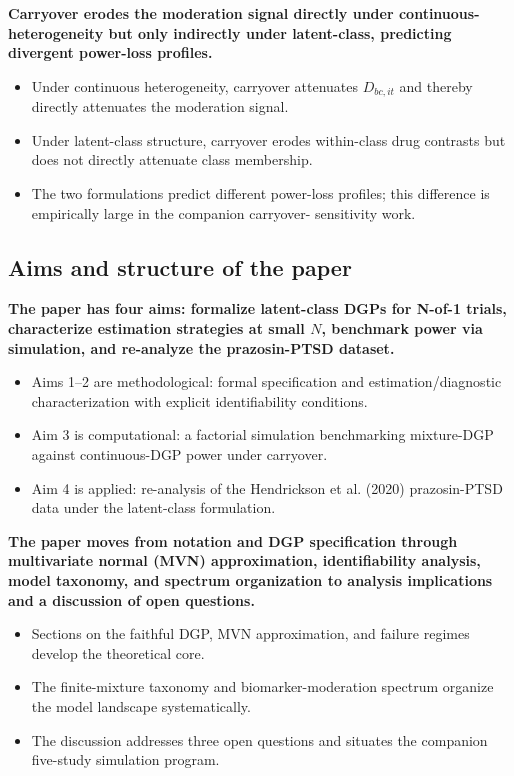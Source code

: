 \documentclass[
  11pt,
]{article}
\begin{document}
\textbf{Carryover erodes the moderation signal directly under
continuous-heterogeneity but only indirectly under latent-class,
predicting divergent power-loss profiles.}

\begin{itemize}\setlength{\itemsep}{2pt}\setlength{\parskip}{0pt}
\item Under continuous heterogeneity, carryover attenuates $D_{bc,it}$
  and thereby directly attenuates the moderation signal.
\item Under latent-class structure, carryover erodes within-class drug
  contrasts but does not directly attenuate class membership.
\item The two formulations predict different power-loss profiles; this
  difference is empirically large in the companion carryover-
  sensitivity work.
\end{itemize}

\subsection{Aims and structure of the paper}\label{aims-and-structure-of-the-paper}

\textbf{The paper has four aims: formalize latent-class DGPs for N-of-1
trials, characterize estimation strategies at small $N$, benchmark
power via simulation, and re-analyze the prazosin-PTSD dataset.}

\begin{itemize}\setlength{\itemsep}{2pt}\setlength{\parskip}{0pt}
\item Aims 1--2 are methodological: formal specification and
  estimation/diagnostic characterization with explicit identifiability
  conditions.
\item Aim 3 is computational: a factorial simulation benchmarking
  mixture-DGP against continuous-DGP power under carryover.
\item Aim 4 is applied: re-analysis of the Hendrickson et al. (2020)
  prazosin-PTSD data under the latent-class formulation.
\end{itemize}

\textbf{The paper moves from notation and DGP specification through
multivariate normal (MVN) approximation, identifiability analysis,
model taxonomy, and spectrum
organization to analysis implications and a discussion of open
questions.}

\begin{itemize}\setlength{\itemsep}{2pt}\setlength{\parskip}{0pt}
\item Sections on the faithful DGP, MVN approximation, and failure
  regimes develop the theoretical core.
\item The finite-mixture taxonomy and biomarker-moderation spectrum
  organize the model landscape systematically.
\item The discussion addresses three open questions and situates the
  companion five-study simulation program.
\end{itemize}
\end{document}
